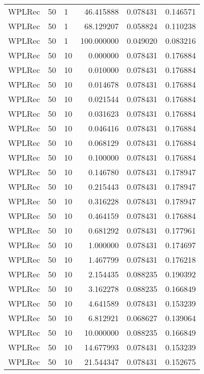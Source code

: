 \begin{tabular}{lllrrr}
 WPLRec &   50 &      1 &   46.415888 &     0.078431 &  0.146571 \\
 WPLRec &   50 &      1 &   68.129207 &     0.058824 &  0.110238 \\
 WPLRec &   50 &      1 &  100.000000 &     0.049020 &  0.083216 \\
 WPLRec &   50 &     10 &    0.000000 &     0.078431 &  0.176884 \\
 WPLRec &   50 &     10 &    0.010000 &     0.078431 &  0.176884 \\
 WPLRec &   50 &     10 &    0.014678 &     0.078431 &  0.176884 \\
 WPLRec &   50 &     10 &    0.021544 &     0.078431 &  0.176884 \\
 WPLRec &   50 &     10 &    0.031623 &     0.078431 &  0.176884 \\
 WPLRec &   50 &     10 &    0.046416 &     0.078431 &  0.176884 \\
 WPLRec &   50 &     10 &    0.068129 &     0.078431 &  0.176884 \\
 WPLRec &   50 &     10 &    0.100000 &     0.078431 &  0.176884 \\
 WPLRec &   50 &     10 &    0.146780 &     0.078431 &  0.178947 \\
 WPLRec &   50 &     10 &    0.215443 &     0.078431 &  0.178947 \\
 WPLRec &   50 &     10 &    0.316228 &     0.078431 &  0.178947 \\
 WPLRec &   50 &     10 &    0.464159 &     0.078431 &  0.176884 \\
 WPLRec &   50 &     10 &    0.681292 &     0.078431 &  0.177961 \\
 WPLRec &   50 &     10 &    1.000000 &     0.078431 &  0.174697 \\
 WPLRec &   50 &     10 &    1.467799 &     0.078431 &  0.176218 \\
 WPLRec &   50 &     10 &    2.154435 &     0.088235 &  0.190392 \\
 WPLRec &   50 &     10 &    3.162278 &     0.088235 &  0.166849 \\
 WPLRec &   50 &     10 &    4.641589 &     0.078431 &  0.153239 \\
 WPLRec &   50 &     10 &    6.812921 &     0.068627 &  0.139064 \\
 WPLRec &   50 &     10 &   10.000000 &     0.088235 &  0.166849 \\
 WPLRec &   50 &     10 &   14.677993 &     0.078431 &  0.153239 \\
 WPLRec &   50 &     10 &   21.544347 &     0.078431 &  0.152675 \\

\end{tabular}
